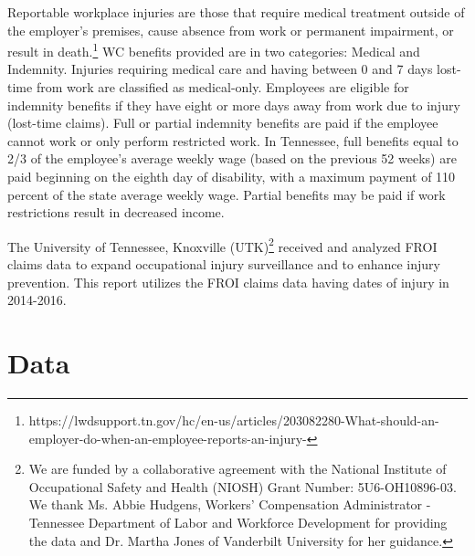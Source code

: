 \documentclass[9pt, oneside]{article}   	%
\begin{document}
Reportable workplace injuries are those that require medical treatment outside of the employer's premises, cause absence from work or permanent impairment, or result in death.\footnote{https://lwdsupport.tn.gov/hc/en-us/articles/203082280-What-should-an-employer-do-when-an-employee-reports-an-injury-}  WC benefits provided are in two categories: Medical and Indemnity. Injuries requiring medical care and having between 0 and 7 days lost-time from work are classified as medical-only. Employees are eligible for indemnity benefits if they have eight or more days away from work due to injury (lost-time claims). Full or partial indemnity benefits are paid if the employee cannot work or only perform restricted work. In Tennessee, full benefits equal to 2/3 of the employee's average weekly wage (based on the previous 52 weeks) are paid beginning on the eighth day of disability, with a maximum payment of 110 percent of the state average weekly wage. Partial benefits may be paid if work restrictions result in decreased income.  

The University of Tennessee, Knoxville (UTK)\footnote{We are funded by a collaborative agreement with the National Institute of Occupational Safety and Health (NIOSH) Grant Number: 5U6-OH10896-03. We thank Ms. Abbie Hudgens, Workers' Compensation Administrator - Tennessee Department of Labor and Workforce Development for providing the data and Dr. Martha Jones of Vanderbilt University for her guidance.} received and analyzed FROI claims data to expand occupational injury surveillance and to enhance injury prevention. This report utilizes the FROI claims data having dates of injury in 2014-2016. 


















\section{Data}
\end{document}
